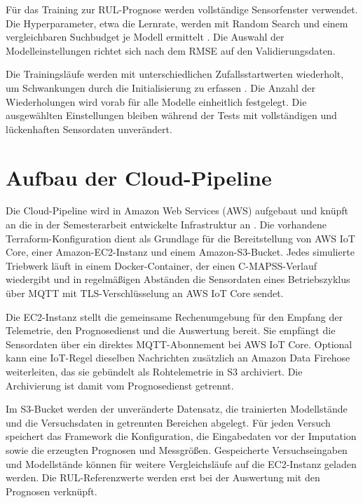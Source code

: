Für das Training zur \ac{RUL}-Prognose werden vollständige Sensorfenster verwendet. Die Hyperparameter, etwa die Lernrate, werden mit Random Search und einem vergleichbaren Suchbudget je Modell ermittelt \parencite[281--283]{bergstraRandomSearchHyperParameter}. Die Auswahl der Modelleinstellungen richtet sich nach dem \ac{RMSE} auf den Validierungsdaten.

Die Trainingsläufe werden mit unterschiedlichen Zufallsstartwerten wiederholt, um Schwankungen durch die Initialisierung zu erfassen \parencite{bouthillierAccountingVarianceMachine}. Die Anzahl der Wiederholungen wird vorab für alle Modelle einheitlich festgelegt. Die ausgewählten Einstellungen bleiben während der Tests mit vollständigen und lückenhaften Sensordaten unverändert.

\section{Aufbau der Cloud-Pipeline}

Die Cloud-Pipeline wird in Amazon Web Services (AWS) aufgebaut und knüpft an die in der Semesterarbeit entwickelte Infrastruktur an \parencite[4--5]{moritzNaehrerCloudPredictiveMaintenance2026}. Die vorhandene Terraform-Konfiguration dient als Grundlage für die Bereitstellung von AWS IoT Core, einer Amazon-EC2-Instanz und einem Amazon-S3-Bucket. Jedes simulierte Triebwerk läuft in einem Docker-Container, der einen C-MAPSS-Verlauf wiedergibt und in regelmäßigen Abständen die Sensordaten eines Betriebszyklus über MQTT mit TLS-Verschlüsselung an AWS IoT Core sendet.

Die EC2-Instanz stellt die gemeinsame Rechenumgebung für den Empfang der Telemetrie, den Prognosedienst und die Auswertung bereit. Sie empfängt die Sensordaten über ein direktes MQTT-Abonnement bei AWS IoT Core. Optional kann eine IoT-Regel dieselben Nachrichten zusätzlich an Amazon Data Firehose weiterleiten, das sie gebündelt als Rohtelemetrie in S3 archiviert. Die Archivierung ist damit vom Prognosedienst getrennt.

Im S3-Bucket werden der unveränderte Datensatz, die trainierten Modellstände und die Versuchsdaten in getrennten Bereichen abgelegt. Für jeden Versuch speichert das Framework die Konfiguration, die Eingabedaten vor der Imputation sowie die erzeugten Prognosen und Messgrößen. Gespeicherte Versuchseingaben und Modellstände können für weitere Vergleichsläufe auf die EC2-Instanz geladen werden. Die RUL-Referenzwerte werden erst bei der Auswertung mit den Prognosen verknüpft.

